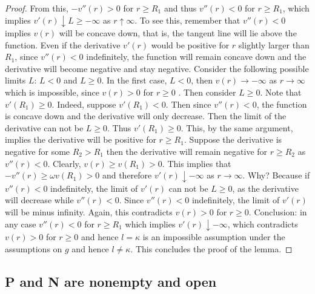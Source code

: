 \begin{proof}
From this, $-v''(r)>0$ for $r\geq R_1$ and thus $v''(r)<0$ for $r\geq R_1$, which implies $v'(r)\downarrow L\geq-\infty$ as $r\uparrow\infty$. To see this, remember that $v''(r)<0$ implies $v(r)$ will be concave down, that is, the tangent line will lie above the function. Even if the derivative $v'(r)$ would be positive for $r$ slightly larger than $R_1$, since $v''(r)<0$ indefinitely, the function will remain concave down and the derivative will become negative and stay negative. Consider the following possible limits $L$: $L<0$ and $L\geq0$. In the first case, $L<0$, then $v(r)\to-\infty$ as $r\to\infty$ which is impossible, since $v(r)>0$ for $r\geq0$ \Lightning. Then consider $L\geq0$. Note that $v'(R_1)\geq0$. Indeed, suppose $v'(R_1)<0$. Then since $v''(r)<0$, the function is concave down and the derivative will only decrease. Then the limit of the derivative can not be $L\geq0$. Thus $v'(R_1)\geq0$. This, by the same argument, implies the derivative will be positive for $r\geq R_1$. Suppose the derivative is negative for some $R_2>R_1$ then the derivative will remain negative for $r\geq R_2$ as $v''(r)<0$. Clearly, $v(r)\geq v(R_1)>0$. This implies that $-v''(r)\geq\omega v(R_1)>0$ and therefore $v'(r)\downarrow-\infty$ as $r\to\infty$. Why? Because if $v''(r)<0$ indefinitely, the limit of $v'(r)$ can not be $L\geq0$, as the derivative will decrease while $v''(r)<0$. Since $v''(r)<0$ indefinitely, the limit of $v'(r)$ will be minus infinity. Again, this contradicts $v(r)>0$ for $r\geq0$. \Lightning Conclusion: in any case $v''(r)<0$ for $r\geq R_1$ which implies $v'(r)\downarrow-\infty$, which contradicts $v(r)>0$ for $r\geq0$ and hence $l=\kappa$ is an impossible assumption under the assumptions on $g$ and hence $l\neq\kappa$. This concludes the proof of the lemma.
\end{proof}

\subsection{P and N are nonempty and open}

